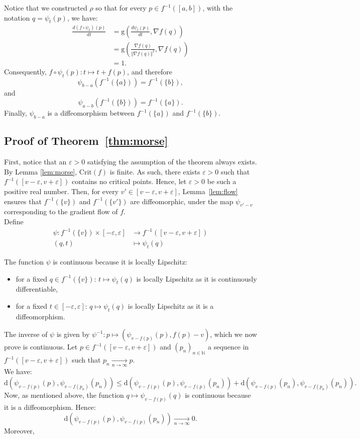 \documentclass[pdflatex,sn-mathphys-ay]{sn-jnl}%
\newcommand{\dis}{\mathrm{d}}
\newcommand{\critic}{{\mathrm {Crit}}}
\newcommand{\converge}{\underset{n\rightarrow\infty}{\longrightarrow}}
\newcommand{\g}{\mathrm{g}}
\newcommand{\N}{\mathbb{N}}
\newcommand{\eps}{\varepsilon}
\newcommand{\preim}[2]{#1^{-1}(#2)}
\theoremstyle{thmstyleone}%
\begin{document}
\begin{appendices}
Notice that we constructed $\rho$ so that for every $p\in \preim{f}{[a,b]}$, with the notation $q=\psi_t(p)$, we have:
\begin{align*}
\frac{d(f\circ\psi_t)(p)}{dt}&=\g\left(\frac{d\psi_t(p)}{dt},\nabla f(q)\right)\\
&=\g\left(\frac{\nabla f(q)}{\Vert\nabla f(q)\Vert^2},\nabla f(q)\right)\\
&=1.
\end{align*}
Consequently, $f\circ\psi_t(p)\colon t\mapsto t+f(p)$, and therefore $$\psi_{b-a}\left(\preim{f}{\{a\}}\right)= \preim{f}{\{b\}},$$
and 
$$\psi_{a-b}\left(\preim{f}{\{b\}}\right)= \preim{f}{\{a\}}.$$
Finally, $\psi_{b-a}$ is a diffeomorphism between $\preim{f}{\{a\}}$ and $\preim{f}{\{b\}}$.

\subsection{Proof of Theorem~\ref{thm:morse}}
First, notice that an $\eps>0$ satisfying the assumption of the theorem always exists. By Lemma \ref{lem:morse}, $\critic(f)$ is finite. As such, there exists $\eps>0$ such that $\preim{f}{[v-\eps,v+\eps]}$ contains no critical points. Hence, let $\eps>0$ be such a positive real number. Then, for every $v'\in[v-\eps,v+\eps]$, Lemma~\ref{lem:flow} ensures that $\preim{f}{\{v\}}$ and $\preim{f}{\{v'\}}$ are diffeomorphic, under the map $\psi_{v'-v}$ corresponding to the gradient flow of $f$.\\
Define 
\begin{align*}
\psi\colon \preim{f}{\{v\}}\times[-\eps,\eps] &\longrightarrow \preim{f}{[v-\eps,v+\eps]}  \\
(q,t)&\longmapsto \psi_{t}(q)
\end{align*}

The function $\psi$ is continuous because it is locally Lipschitz: 
\begin{itemize}
    \item for a fixed $q\in \preim{f}{\{v\}}$: $t\mapsto\psi_{t}(q)$ is locally Lipschitz as it is continuously differentiable,
    \item for a fixed $t\in [-\eps,\eps]$: $q\mapsto\psi_{t}(q)$ is locally Lipschitz as it is a diffeomorphism.
\end{itemize}
The inverse of $\psi$ is given by $\psi^{-1}\colon p \longmapsto (\psi_{v-f(p)}(p),f(p)-v)$, which we now prove is continuous. Let $p\in \preim{f}{[v-\eps,v+\eps]}$ and $(p_n)_{n\in\N}$ a sequence in $\preim{f}{[v-\eps,v+\eps]}$ such that $p_n\converge p$.\\
We have:
$$\dis(\psi_{v-f(p)}(p),\psi_{v-f(p_n)}(p_n))\leq \dis(\psi_{v-f(p)}(p),\psi_{v-f(p)}(p_n))+\dis(\psi_{v-f(p)}(p_n),\psi_{v-f(p_n)}(p_n)).$$
Now, as mentioned above, the function $q\mapsto\psi_{v-f(p)}(q)$ is continuous because it is a diffeomorphism. Hence:
$$\dis(\psi_{v-f(p)}(p),\psi_{v-f(p)}(p_n))\converge 0.$$
Moreover,


\end{appendices}
\end{document}
